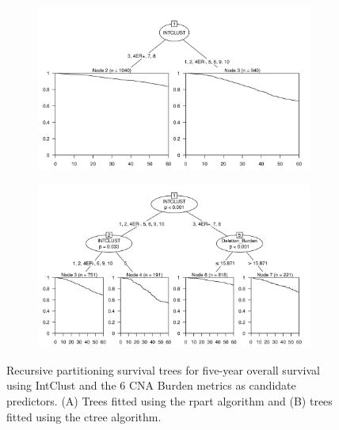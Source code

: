 \begin{figure}[!htb]
\centering

\vspace{0.5cm}

\begin{subfigure}{\textwidth}
\subcaption{}
\includegraphics[width=1\textwidth]{../figures/Appendices/Appendix_B/PartyKit_Survival_Burden_FiveYearOS_INTCLUST.png}
\end{subfigure}

\vspace{2cm}

\begin{subfigure}{\textwidth}
\subcaption{}
\includegraphics[width=1\textwidth]{../figures/Appendices/Appendix_B/Ctree_Survival_Burden_FiveYearOS_INTCLUST.png}
\end{subfigure}

\vspace{0.5cm}

\caption[Recursive partitioning survival trees for five-year overall survival using IntClust and the 6 CNA Burden metrics as candidate predictors.]{Recursive partitioning survival trees for five-year overall survival using IntClust and the 6 CNA Burden metrics as candidate predictors. (A) Trees fitted using the rpart algorithm and (B) trees fitted using the ctree algorithm.}
\end{figure}

